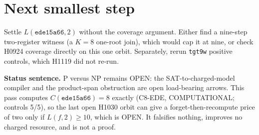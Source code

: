 \documentclass[11pt]{article}
\begin{document}
\section*{Next smallest step}
Settle $L(\texttt{ede15a66},2)$ without the coverage argument. Either find a nine-step two-register witness (a $K=8$ one-root join), which would cap it at nine, or check H0924 coverage directly on this one orbit. Separately, rerun \texttt{tgt9w} positive controls, which H1119 did not re-run.

\bigskip
\noindent\textbf{Status sentence.} P versus NP remains OPEN: the SAT-to-charged-model compiler and the product-span obstruction are open load-bearing arrows. This pass computes $C(\texttt{ede15a66})=8$ exactly (C8-EDE, COMPUTATIONAL; controls 5/5), so the last open H1030 orbit can give a forget-then-recompute price of two only if $L(f,2)\ge10$, which is OPEN. It falsifies nothing, improves no charged resource, and is not a proof.
\end{document}
